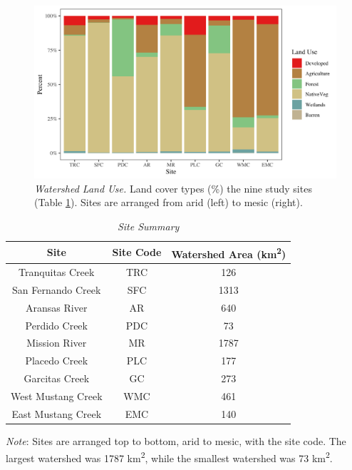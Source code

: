 \begin{landscape}
\begin{figure}[htb]
\begin{center}
\includegraphics[scale=0.3]{Figs/LandUse.png}
\caption[Watershed Land Use]{\textit{Watershed Land Use.} Land cover types (\%) the nine study sites (Table \ref{tab:WS Area}). Sites are arranged from arid (left) to mesic (right).}
\label{Fig:LandUse}
\end{center}
\end{figure}
\end{landscape}

\begin{table}[htb]
\caption[Site Summary]{\textit{Site Summary}}
\begin{center}
\begin{tabular}
[c]{ccc}\hline
Site & Site Code & Watershed Area (\unit{\square\km})\\\hline
Tranquitas Creek & TRC & 126\\ 
San Fernando Creek & SFC & 1313\\ 
Aransas River & AR &  640 \\ 
Perdido Creek & PDC & 73 \\ 
Mission River & MR & 1787 \\ 
Placedo Creek& PLC & 177 \\ 
Garcitas Creek & GC & 273 \\ 
West Mustang Creek & WMC & 461\\ 
East Mustang Creek & EMC & 140\\\hline
\end{tabular}
\end{center}
\small \textit{Note}: Sites are arranged top to bottom, arid to mesic, with the site code. The largest watershed was 1787 \unit{\square\km}, while the smallest watershed was 73 \unit{\square\km}.
\label{tab:WS Area}
\end{table}

